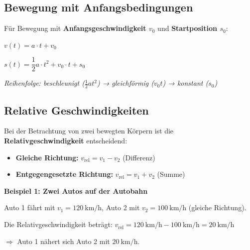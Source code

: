 \documentclass[11pt, a4paper]{article}
\newcommand{\wichtig}[1]{\textcolor{physik}{\textbf{#1}}}
\begin{document}
\subsection{Bewegung mit Anfangsbedingungen}

Für Bewegung mit \textbf{Anfangsgeschwindigkeit $v_0$} und \textbf{Startposition $s_0$}:

\begin{formelbox}[title=Allgemeine Bewegungsgleichungen]
\begin{center}
{\large $v(t) = a \cdot t + v_0$}

\vspace{0.5em}

{\large $s(t) = \dfrac{1}{2} a \cdot t^2 + v_0 \cdot t + s_0$}
\end{center}
\small\textit{Reihenfolge: beschleunigt ($\frac{1}{2}at^2$) → gleichförmig ($v_0 t$) → konstant ($s_0$)}
\end{formelbox}

\subsection{Relative Geschwindigkeiten}

Bei der Betrachtung von zwei bewegten Körpern ist die \wichtig{Relativgeschwindigkeit} entscheidend:

\begin{formelbox}[title=Relativgeschwindigkeit]
\begin{itemize}[leftmargin=1em]
    \item \textbf{Gleiche Richtung:} $v_{\text{rel}} = v_1 - v_2$ (Differenz)
    \item \textbf{Entgegengesetzte Richtung:} $v_{\text{rel}} = v_1 + v_2$ (Summe)
\end{itemize}
\end{formelbox}

\begin{beispielbox}
\textbf{Beispiel 1: Zwei Autos auf der Autobahn}

Auto 1 fährt mit $v_1 = \SI{120}{\kilo\metre\per\hour}$, Auto 2 mit $v_2 = \SI{100}{\kilo\metre\per\hour}$ (gleiche Richtung).

Die Relativgeschwindigkeit beträgt: $v_{\text{rel}} = \SI{120}{\kilo\metre\per\hour} - \SI{100}{\kilo\metre\per\hour} = \SI{20}{\kilo\metre\per\hour}$

$\Rightarrow$ Auto 1 nähert sich Auto 2 mit $\SI{20}{\kilo\metre\per\hour}$.
\end{beispielbox}
\end{document}
